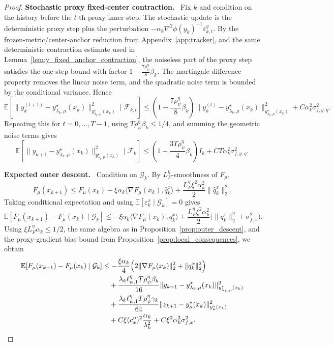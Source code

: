 \documentclass{article}
\newcommand{\proofstep}[1]{\par\smallskip\noindent\textbf{#1}\ }
\begin{document}
\begin{proof}
\proofstep{Stochastic proxy fixed-center contraction.}
Fix \(k\) and condition on the history before the \(t\)-th proxy inner step. The stochastic update is
the deterministic proxy step plus the perturbation
\(-\alpha_k \nabla^2\phi(y_k)^{-1}\varepsilon_{k,t}^y\). By the frozen-metric/center-anchor reduction from
Appendix~\ref{app:tracker}, 
and the same deterministic contraction estimate used in Lemma~\ref{lem:y_fixed_anchor_contraction},
the noiseless part of the proxy step satisfies the one-step bound with factor
\(1-\frac{7\rho_\psi^\eta}{8}\beta_k\). The martingale-difference property removes the linear
noise term, and the quadratic noise term is bounded by the conditional variance. Hence
\[
\mathbb E\!\left[
\|y_k^{(t+1)}-y_{\lambda_k,\mu}^\star(x_k)\|^2_{y_{\lambda_k,\mu}^\star(x_k)}
\mid \mathcal F_{k,t}
\right]
\le
\left(1-\frac{7\rho_\psi^\eta}{8}\beta_k\right)
\|y_k^{(t)}-y_{\lambda_k,\mu}^\star(x_k)\|^2_{y_{\lambda_k,\mu}^\star(x_k)}
+
C\alpha_k^2\sigma_{f,y,\eta}^2 .
\]
Repeating this for \(t=0,\ldots,T-1\), using
\(T\rho_\psi^\eta\beta_k\le 1/4\), and summing the geometric noise terms gives
\begin{equation}\label{eq:stoch_proxy_fixed_contraction}
\mathbb E\!\left[
\|y_{k+1}-y_{\lambda_k,\mu}^\star(x_k)\|^2_{y_{\lambda_k,\mu}^\star(x_k)}
\mid \mathcal F_k
\right]
\le
\left(1-\frac{3T\rho_\psi^\eta}{4}\beta_k\right)I_k
+
CT\alpha_k^2\sigma_{f,y,\eta}^2 .
\end{equation}

\proofstep{Expected outer descent.}
Condition on \(\mathcal G_k\). By \(L_F^\eta\)-smoothness of \(F_\mu\),
\[
F_\mu(x_{k+1})
\le
F_\mu(x_k)
-\xi\alpha_k\langle \nabla F_\mu(x_k),\widehat q_k^x\rangle
+
\frac{L_F^\eta\xi^2\alpha_k^2}{2}\|\widehat q_k^x\|_2^2 .
\]
Taking conditional expectation and using
\(\mathbb E[\varepsilon_k^x\mid \mathcal G_k]=0\) gives
\[
\mathbb E[F_\mu(x_{k+1})-F_\mu(x_k)\mid \mathcal G_k]
\le
-\xi\alpha_k\langle \nabla F_\mu(x_k),q_k^x\rangle
+
\frac{L_F^\eta\xi^2\alpha_k^2}{2}
\bigl(\|q_k^x\|_2^2+\sigma_{f,x}^2\bigr).
\]
Using \(\xi L_F^\eta\alpha_k\le 1/2\), the same algebra as in
Proposition~\ref{prop:outer_descent}, and the proxy-gradient bias bound from
Proposition~\ref{prop:local_consequences}, we obtain
\begin{align}
\mathbb E[F_\mu(x_{k+1})-F_\mu(x_k)\mid \mathcal G_k]
&\le
-\frac{\xi\alpha_k}{4}
\Bigl(2\|\nabla F_\mu(x_k)\|_2^2+\|q_k^x\|_2^2\Bigr)
\nonumber\\
&\quad
+
\frac{\lambda_k\ell_{\psi,1}^\eta T\rho_\psi^\eta\beta_k}{16}
\|y_{k+1}-y_{\lambda_k,\mu}^\star(x_k)\|_{y_{\lambda_k,\mu}^\star(x_k)}^2
\nonumber\\
&\quad
+
\frac{\lambda_k\ell_{\psi,1}^\eta T\rho_\psi^\eta\gamma_k}{64}
\|z_{k+1}-y_\mu^\star(x_k)\|_{y_\mu^\star(x_k)}^2
\nonumber\\
&\quad
+
C\xi(c_x^\eta)^2\frac{\alpha_k}{\lambda_k^2}
+
C\xi^2\alpha_k^2\sigma_{f,x}^2 .
\label{eq:stoch_outer_descent}
\end{align}


\end{proof}
\end{document}
